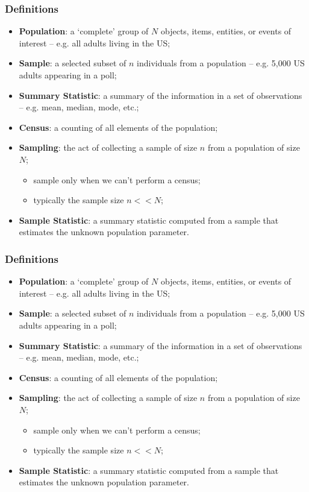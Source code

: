\documentclass[aspectratio=169]{beamer}
\theoremstyle{principle}
\begin{document}
\begin{frame}
\frametitle{Definitions}
\begin{itemize}
\item \textbf{Population}: a `complete' group of $N$ objects, items, entities, or events of interest -- e.g. all adults living in the US;
\bigskip
\item \textbf{Sample}: a selected subset of $n$ individuals from a population -- e.g. 5,000 US adults appearing in a poll;
\bigskip
\item \textbf{Summary Statistic}: a summary of the information in a set of observations -- e.g. mean, median, mode, etc.;
\bigskip
\item \textbf{Census}: a counting of all elements of the population;
\bigskip
\item[]\color{white} \textbf{Sampling}: the act of collecting a sample of size $n$ from a population of size $N$;
\begin{itemize} 
\item[]\color{white} sample only when we can’t perform a census;
\item[]\color{white} typically the sample size $n<<N$;
\end{itemize}
\bigskip
\item[]\color{white} \textbf{Sample Statistic}: a summary statistic computed from a sample that estimates the unknown population parameter.
\end{itemize}
\end{frame}

\begin{frame}
\frametitle{Definitions}
\begin{itemize}
\item \textbf{Population}: a `complete' group of $N$ objects, items, entities, or events of interest -- e.g. all adults living in the US;
\bigskip
\item \textbf{Sample}: a selected subset of $n$ individuals from a population -- e.g. 5,000 US adults appearing in a poll;
\bigskip
\item \textbf{Summary Statistic}: a summary of the information in a set of observations -- e.g. mean, median, mode, etc.;
\bigskip
\item \textbf{Census}: a counting of all elements of the population;
\bigskip
\item \textbf{Sampling}: the act of collecting a sample of size $n$ from a population of size $N$;
\begin{itemize} 
\item sample only when we can’t perform a census;
\item typically the sample size $n<<N$;
\end{itemize}
\bigskip
\item \textbf{Sample Statistic}: a summary statistic computed from a sample that estimates the unknown population parameter.
\end{itemize}
\end{frame}
\end{document}
